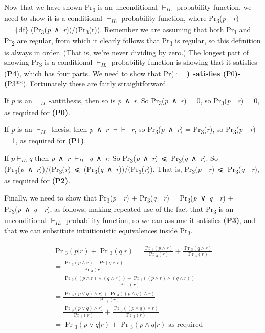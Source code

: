 \documentclass[
  10pt,
  letterpaper,
  DIV=11,
  numbers=noendperiod,
  twoside]{scrartcl}
\begin{document}
Now that we have shown Pr\textsubscript{3} is an unconditional
\(\vdash_{IL}\)-probability function, we need to show it is a
conditional \(\vdash_{IL}\)-probability function, where
Pr\textsubscript{3}(\emph{p}~\textbar~\emph{r}) =\_\{df\}
(Pr\textsubscript{3}(\emph{p}~∧~\emph{r}))/(Pr\textsubscript{3}(r)).
Remember we are assuming that both Pr\textsubscript{1} and
Pr\textsubscript{2} are regular, from which it clearly follows that
Pr\textsubscript{3} is regular, so this definition is always in order.
(That is, we're never dividing by zero.) The longest part of showing
Pr\textsubscript{3} is a conditional \(\vdash_{IL}\)-probability
function is showing that it satisfies (\textbf{P4}), which has four
parts. We need to show that Pr(·~\textbar~\textbf{) satisfies
(}P0\textbf{)-(}P3**). Fortunately these are fairly straightforward.

If \emph{p} is an \(\vdash_{IL}\)-antithesis, then so is
\emph{p}~∧~\emph{r}. So Pr\textsubscript{3}(\emph{p}~∧~\emph{r}) = 0, so
Pr\textsubscript{3}(\emph{p}~\textbar~\emph{r}) = 0, as required for
\textbf{(P0)}.

If \emph{p} is an \(\vdash_{IL}\)-thesis, then \emph{p}~∧~\emph{r}
\(\dashv \vdash\)~\emph{r}, so Pr\textsubscript{3}(\emph{p}~∧~\emph{r})
= Pr\textsubscript{3}(\emph{r}), so
Pr\textsubscript{3}(\emph{p}~\textbar~\emph{r}) = 1, as required for
\textbf{(P1)}.

If \(p \vdash_{IL} q\) then \emph{p}~∧~\emph{r} \(\vdash_{IL}\)
\emph{q}~∧~\emph{r}. So
Pr\textsubscript{3}(\emph{p}~∧~\emph{r})~⩽~Pr\textsubscript{3}(\emph{q}~∧~\emph{r}).
So
(Pr\textsubscript{3}(\emph{p}~∧~\emph{r}))/(Pr\textsubscript{3}(\emph{r})~⩽~(Pr\textsubscript{3}(\emph{q}~∧~\emph{r}))/(Pr\textsubscript{3}(\emph{r})).
That is,
Pr\textsubscript{3}(\emph{p}~\textbar~\emph{r})~⩽~Pr\textsubscript{3}(\emph{q}~\textbar~\emph{r}),
as required for \textbf{(P2)}.

Finally, we need to show that
Pr\textsubscript{3}(\emph{p}~\textbar~\emph{r}) +
Pr\textsubscript{3}(\emph{q}~\textbar~\emph{r}) =
Pr\textsubscript{3}(\emph{p}~∨~\emph{q}~\textbar~\emph{r}) +
Pr\textsubscript{3}(\emph{p}~∧~\emph{q}~\textbar~\emph{r}), as follows,
making repeated use of the fact that Pr\textsubscript{3} is an
unconditional \(\vdash_{IL}\)-probability function, so we can assume it
satisfies \textbf{(P3)}, and that we can substitute intuitionistic
equivalences inside Pr\textsubscript{3}.

\[
\begin{aligned}
\Pr{}_3(p | r) + \Pr{}_3(q | r) = \frac{\Pr{}_3(p ∧ r)}{\Pr{}_3(r)} + \frac{\Pr{}_3(q ∧ r)}{\Pr{}_3(r)} \\
= \frac{\Pr{}_3(p ∧ r) + Pr(q ∧ r)}{\Pr{}_3(r)} \\
= \frac{\Pr{}_3((p ∧ r) ∨ (q ∧ r)) + \Pr{}_3((p ∧ r) ∧ (q ∧ r))}{\Pr{}_3(r)} \\
=\frac{\Pr{}_3(p ∨ q) ∧ r) + \Pr{}_3((p ∧ q) ∧ r)}{\Pr{}_3(r)} \\
=\frac{\Pr{}_3(p ∨ q) ∧ r)}{\Pr{}_3(r)} + \frac{\Pr{}_3((p ∧ q) ∧ r)}{\Pr{}_3(r)} \\
=\Pr{}_3(p ∨ q | r) + \Pr{}_3(p ∧ q | r) \text{ as required}
\end{aligned}
\]
\end{document}
